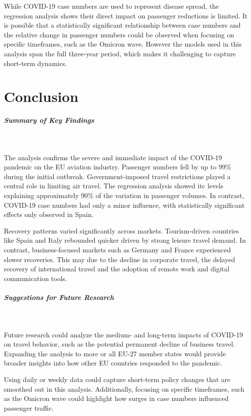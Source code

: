 \documentclass[12pt,onehalfspacing,headsepline,oneside,openright,a4paper, fleqn]{report}
\begin{document}
While COVID-19 case numbers are used to represent disease spread, the regression analysis shows their direct impact on passenger reductions is limited. It is possible that a statistically significant relationship between case numbers and the relative change in passenger numbers could be observed when focusing on specific timeframes, such as the Omicron wave. However the models used in this analysis span the full three-year period, which makes it challenging to capture short-term dynamics.

\chapter{Conclusion}

\paragraph{Summary of Key Findings}
\

The analysis confirms the severe and immediate impact of the COVID-19 pandemic on the EU aviation industry. Passenger numbers fell by up to 99\% during the initial outbreak. Government-imposed travel restrictions played a central role in limiting air travel. The regression analysis showed \gls{itc} levels explaining approximately 90\% of the variation in passenger volumes. In contrast, COVID-19 case numbers had only a minor influence, with statistically significant effects only observed in Spain.

Recovery patterns varied significantly across markets. Tourism-driven countries like Spain and Italy rebounded quicker driven by strong leisure travel demand. In contrast, business-focused markets such as Germany and France experienced slower recoveries. This may due to the decline in corporate travel, the delayed recovery of international travel and the adoption of remote work and digital communication tools. 

\paragraph{Suggestions for Future Research}
\

Future research could analyze the medium- and long-term impacts of COVID-19 on travel behavior, such as the potential permanent decline of business travel. Expanding the analysis to more or all EU-27 member states would provide broader insights into how other EU countries responded to the pandemic. 

Using daily or weekly data could capture short-term policy changes that are smoothed out in this analysis. Additionally, focusing on specific timeframes, such as the Omicron wave could highlight how surges in case numbers influenced passenger traffic.
\end{document}

